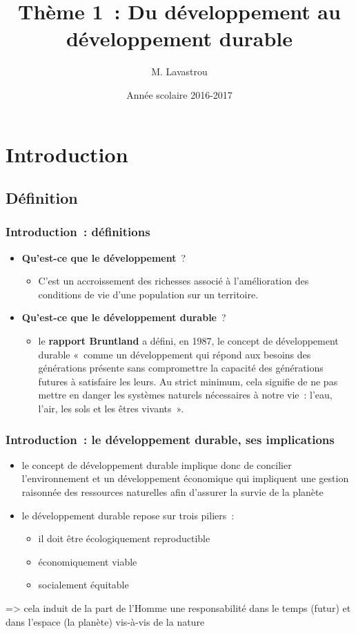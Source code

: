 \documentclass[C]{beamer}
\title{Thème 1~: Du développement au développement durable}
\author{M. Lavastrou}
\institute{Classes de seconde -- Lycée Jean Lurçat}
\date{Année scolaire 2016-2017}
\begin{document}
	\begin{frame}
	\titlepage
	\end{frame}
	
	\section*{Introduction}
	\subsection*{Définition}
	\begin{frame}
	\frametitle{Introduction~: définitions}
	\begin{itemize}
	\item \textbf{Qu'est-ce que le développement}~?\\
\pause
		\begin{itemize}
		\item C'est un accroissement des richesses associé à l'amélioration des conditions de vie d'une population sur un territoire.
		\end{itemize}
	\item \textbf{Qu'est-ce que le développement durable}~?\\
\pause
		\begin{itemize}
		\item le \textbf{rapport Bruntland} a défini, en 1987, le concept de développement durable «~comme un développement qui répond aux besoins des générations présente sans compromettre la capacité des générations futures à satisfaire les leurs. Au strict minimum, cela signifie de ne pas mettre en danger les systèmes naturels nécessaires à notre vie~: l'eau, l'air, les sols et les \^etres vivants~».
		\end{itemize}
	\end{itemize}
	\end{frame}
	
	\begin{frame}
	\frametitle{Introduction~: le développement durable, ses implications}
	\begin{itemize}
	\item le concept de développement durable implique donc de concilier l'environnement et un développement économique qui impliquent une gestion raisonnée des ressources naturelles afin d'assurer la survie de la planète
	\item le développement durable repose sur trois piliers~: 
		\begin{itemize}
		\item il doit \^etre écologiquement reproductible\\
\pause
		\item économiquement viable\\
\pause
		\item socialement équitable
		\end{itemize}
	\end{itemize}
=> cela induit de la part de l'Homme une responsabilité dans le temps (futur) et dans l'espace (la planète) vis-à-vis de la nature
	\end{frame}
	
\end{document}
